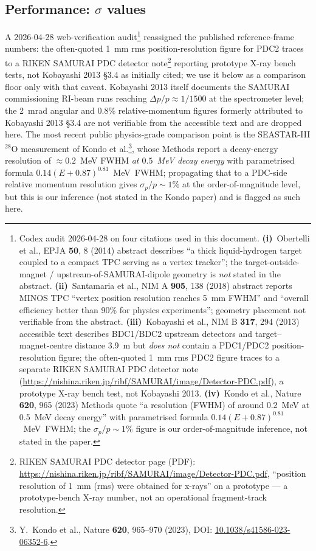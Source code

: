 \documentclass[a4paper, 11pt]{article}
\begin{document}
\subsection{Performance: \texorpdfstring{$\sigma$}{sigma} values}
A 2026-04-28 web-verification audit\footnote{\label{fn:codex_2026_04_28}Codex audit 2026-04-28 on four citations used in this document. \textbf{(i)}~Obertelli et al., EPJA \textbf{50}, 8 (2014) abstract describes ``a thick liquid-hydrogen target coupled to a compact TPC serving as a vertex tracker''; the target-outside-magnet / upstream-of-SAMURAI-dipole geometry is \emph{not} stated in the abstract. \textbf{(ii)}~Santamaria et al., NIM A \textbf{905}, 138 (2018) abstract reports MINOS TPC ``vertex position resolution reaches 5~mm FWHM'' and ``overall efficiency better than 90\% for physics experiments''; geometry placement not verifiable from the abstract. \textbf{(iii)}~Kobayashi et al., NIM B \textbf{317}, 294 (2013) accessible text describes BDC1/BDC2 upstream detectors and target--magnet-centre distance 3.9~m but \emph{does not} contain a PDC1/PDC2 position-resolution figure; the often-quoted 1~mm rms PDC2 figure traces to a separate RIKEN SAMURAI PDC detector note (\url{https://nishina.riken.jp/ribf/SAMURAI/image/Detector-PDC.pdf}), a prototype X-ray bench test, not Kobayashi 2013. \textbf{(iv)}~Kondo et al., Nature \textbf{620}, 965 (2023) Methods quote ``a resolution (FWHM) of around 0.2~MeV at 0.5~MeV decay energy'' with parametrised formula $0.14(E+0.87)^{0.81}$~MeV~FWHM; the $\sigma_p/p \sim 1\%$ figure is our order-of-magnitude inference, not stated in the paper.} reassigned the published reference-frame numbers: the often-quoted 1~mm rms position-resolution figure for PDC2 traces to a RIKEN SAMURAI PDC detector note\footnote{\label{fn:riken_pdc_note}RIKEN SAMURAI PDC detector page (PDF): \url{https://nishina.riken.jp/ribf/SAMURAI/image/Detector-PDC.pdf}, ``position resolution of 1~mm (rms) were obtained for x-rays'' on a prototype --- a prototype-bench X-ray number, not an operational fragment-track resolution.} reporting prototype X-ray bench tests, not Kobayashi 2013 §3.4 as initially cited; we use it below as a comparison floor only with that caveat. Kobayashi 2013 itself documents the SAMURAI commissioning RI-beam runs reaching $\Delta p/p \approx 1/1500$ at the spectrometer level; the 2~mrad angular and 0.8\% relative-momentum figures formerly attributed to Kobayashi 2013 §3.4 are not verifiable from the accessible text and are dropped here. The most recent public physics-grade comparison point is the SEASTAR-III $^{28}$O measurement of Kondo et al.\footnote{\label{fn:kondo2023}Y.~Kondo et al., Nature \textbf{620}, 965--970 (2023), DOI: \href{https://doi.org/10.1038/s41586-023-06352-6}{10.1038/s41586-023-06352-6}.}, whose Methods report a decay-energy resolution of $\approx 0.2$~MeV FWHM \emph{at $0.5$~MeV decay energy} with parametrised formula $0.14(E+0.87)^{0.81}$~MeV~FWHM; propagating that to a PDC-side relative momentum resolution gives $\sigma_p/p \sim 1\%$ at the order-of-magnitude level, but this is our inference (not stated in the Kondo paper) and is flagged as such here.
\end{document}
